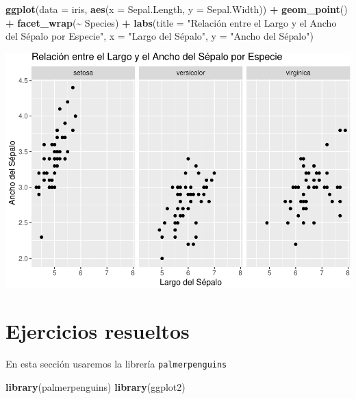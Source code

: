 \documentclass[
]{book}
\newenvironment{Shaded}{\begin{snugshade}}{\end{snugshade}}
\newcommand{\AttributeTok}[1]{\textcolor[rgb]{0.13,0.29,0.53}{#1}}
\newcommand{\FunctionTok}[1]{\textcolor[rgb]{0.13,0.29,0.53}{\textbf{#1}}}
\newcommand{\NormalTok}[1]{#1}
\newcommand{\SpecialCharTok}[1]{\textcolor[rgb]{0.81,0.36,0.00}{\textbf{#1}}}
\newcommand{\StringTok}[1]{\textcolor[rgb]{0.31,0.60,0.02}{#1}}
\begin{document}
\begin{Shaded}
\begin{Highlighting}[]
\FunctionTok{ggplot}\NormalTok{(}\AttributeTok{data =}\NormalTok{ iris, }\FunctionTok{aes}\NormalTok{(}\AttributeTok{x =}\NormalTok{ Sepal.Length, }\AttributeTok{y =}\NormalTok{ Sepal.Width)) }\SpecialCharTok{+} 
  \FunctionTok{geom\_point}\NormalTok{() }\SpecialCharTok{+}
  \FunctionTok{facet\_wrap}\NormalTok{(}\SpecialCharTok{\textasciitilde{}}\NormalTok{ Species) }\SpecialCharTok{+}
  \FunctionTok{labs}\NormalTok{(}\AttributeTok{title =} \StringTok{"Relación entre el Largo y el Ancho del Sépalo por Especie"}\NormalTok{,}
       \AttributeTok{x =} \StringTok{"Largo del Sépalo"}\NormalTok{,}
       \AttributeTok{y =} \StringTok{"Ancho del Sépalo"}\NormalTok{)}
\end{Highlighting}
\end{Shaded}

\includegraphics{bookdown-demo_files/figure-latex/unnamed-chunk-198-1.pdf}

\hypertarget{ejercicios-resueltos-1}{%
\section{Ejercicios resueltos}\label{ejercicios-resueltos-1}}

En esta sección usaremos la librería \texttt{palmerpenguins}

\begin{Shaded}
\begin{Highlighting}[]
\FunctionTok{library}\NormalTok{(palmerpenguins)}
\FunctionTok{library}\NormalTok{(ggplot2)}
\end{Highlighting}
\end{Shaded}
\end{document}
